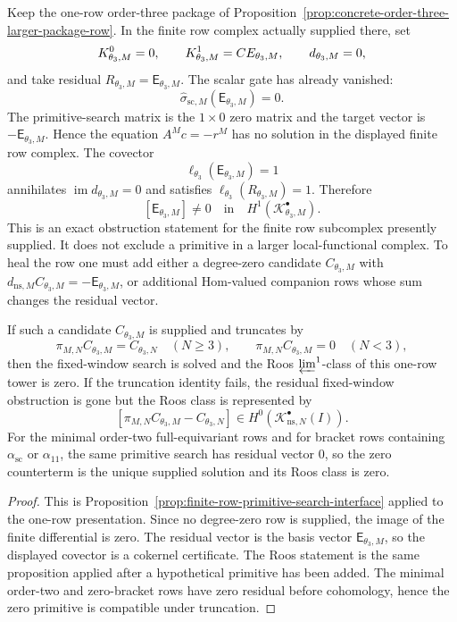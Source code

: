 \begin{prop}\label{prop:theta-three-finite-row-obstruction}
  Keep the one-row order-three package of
  Proposition~\ref{prop:concrete-order-three-larger-package-row}.  In the
  finite row complex actually supplied there, set
  \[
    K^0_{\theta_3,M}=0,\qquad
    K^1_{\theta_3,M}=CE_{\theta_3,M},\qquad
    d_{\theta_3,M}=0,
  \]
  and take residual \(R_{\theta_3,M}=\mathsf E_{\theta_3,M}\).  The scalar
  gate has already vanished:
  \[
    \widehat\sigma_{\mathrm{sc},M}(\mathsf E_{\theta_3,M})=0.
  \]
  The primitive-search matrix is the \(1\times0\) zero matrix and the target
  vector is \(-\mathsf E_{\theta_3,M}\).  Hence the equation
  \(A^M c=-r^M\) has no solution in the displayed finite row complex.
  The covector
  \[
    \ell_{\theta_3}(\mathsf E_{\theta_3,M})=1
  \]
  annihilates \(\operatorname{im}d_{\theta_3,M}=0\) and satisfies
  \(\ell_{\theta_3}(R_{\theta_3,M})=1\).  Therefore
  \[
    [\mathsf E_{\theta_3,M}]\neq0
    \quad\text{in}\quad
    H^1(\mathcal K^\bullet_{\theta_3,M}).
  \]
  This is an exact obstruction statement for the finite row subcomplex
  presently supplied.  It does not exclude a primitive in a larger
  local-functional complex.  To heal the row one must add either a
  degree-zero candidate \(C_{\theta_3,M}\) with
  \(d_{\mathrm{ns},M}C_{\theta_3,M}=-\mathsf E_{\theta_3,M}\), or additional
  Hom-valued companion rows whose sum changes the residual vector.

  If such a candidate \(C_{\theta_3,M}\) is supplied and truncates by
  \[
    \pi_{M,N}C_{\theta_3,M}=C_{\theta_3,N}\quad(N\geq3),
    \qquad
    \pi_{M,N}C_{\theta_3,M}=0\quad(N<3),
  \]
  then the fixed-window search is solved and the Roos
  \(\varprojlim^1\)-class of this one-row tower is zero.  If the
  truncation identity fails, the residual fixed-window obstruction is gone
  but the Roos class is represented by
  \[
    [\pi_{M,N}C_{\theta_3,M}-C_{\theta_3,N}]
    \in H^0(\mathcal K^\bullet_{\mathrm{ns},N}(I)).
  \]
  For the minimal order-two full-equivariant rows and for bracket rows
  containing \(\alpha_{\mathrm{sc}}\) or \(\alpha_{11}\), the same primitive
  search has residual vector \(0\), so the zero counterterm is the unique
  supplied solution and its Roos class is zero.
\end{prop}

\begin{proof}
  This is Proposition~\ref{prop:finite-row-primitive-search-interface}
  applied to the one-row presentation.  Since no degree-zero row is supplied,
  the image of the finite differential is zero.  The residual vector is the
  basis vector \(\mathsf E_{\theta_3,M}\), so the displayed covector is a
  cokernel certificate.  The Roos statement is the same proposition applied
  after a hypothetical primitive has been added.  The minimal order-two and
  zero-bracket rows have zero residual before cohomology, hence the zero
  primitive is compatible under truncation.
\end{proof}

